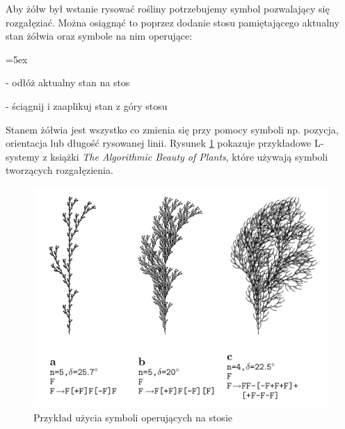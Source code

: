 \documentclass[inz,longabstract]{iithesis}
\begin{document}
            Aby żółw był wstanie rysować rośliny potrzebujemy symbol pozwalający się rozgałęziać. Można osiągnąć to poprzez dodanie stosu pamiętającego aktualny stan żółwia oraz symbole na nim operujące:
            \begin{description}\itemsep=5ex
                \item[{[}] - odłóż aktualny stan na stos
                \item[{]}] - ściągnij i zaaplikuj stan z góry stosu 
            \end{description}
            Stanem żółwia jest wszystko co zmienia się przy pomocy symboli np. pozycja, orientacja lub długość rysowanej linii. Rysunek \ref{fig:lsystemPlants} pokazuje przykładowe L-systemy z książki \textit{The Algorithmic Beauty of Plants}\cite{plants}, które używają symboli tworzących rozgałęzienia. 
            \begin{figure}[H]
                \includegraphics[width=\linewidth]{lsystemPlants.png}
                \caption{Przykład użycia symboli operujących na stosie\cite{plants}} 
                \label{fig:lsystemPlants}
            \end{figure}
            
\end{document}
